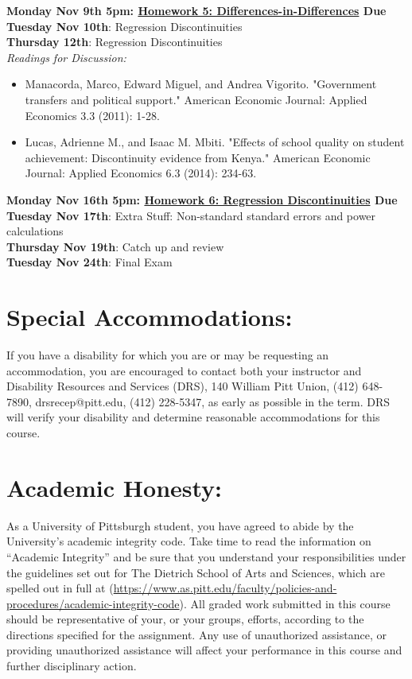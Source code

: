\documentclass[a4paper, 10pt]{article}
\begin{document}
\noindent\textbf{Monday Nov 9th 5pm: \underline{Homework 5: Differences-in-Differences} Due}\\

\noindent\textbf{Tuesday Nov 10th}: Regression Discontinuities\\

\noindent\textbf{Thursday 12th}: Regression Discontinuities\\
\noindent\textit{Readings for Discussion:}
\begin{itemize}
\item Manacorda, Marco, Edward Miguel, and Andrea Vigorito. "Government transfers and political support." American Economic Journal: Applied Economics 3.3 (2011): 1-28.
\item Lucas, Adrienne M., and Isaac M. Mbiti. "Effects of school quality on student achievement: Discontinuity evidence from Kenya." American Economic Journal: Applied Economics 6.3 (2014): 234-63.
\end{itemize}
\noindent\textbf{Monday Nov 16th 5pm: \underline{Homework 6: Regression Discontinuities} Due}\\

\noindent\noindent\textbf{Tuesday Nov 17th}: Extra Stuff: Non-standard standard errors and power calculations\\

\noindent\textbf{Thursday Nov 19th}: Catch up and review\\



\noindent\textbf{Tuesday Nov 24th}: Final Exam\\

\section*{Special Accommodations:}
If you have a disability for which you are or may be requesting an accommodation, you are encouraged to contact both your instructor and Disability Resources and Services (DRS), 140 William Pitt Union, (412) 648-7890, drsrecep@pitt.edu, (412) 228-5347, as early as possible in the term. DRS will verify your disability and determine reasonable accommodations for this course.


\section*{Academic Honesty:}
As a University of Pittsburgh student, you have agreed to abide by the University's academic integrity code. Take time to read the information on “Academic Integrity” and be sure that you understand your responsibilities under the guidelines set out for The Dietrich School of Arts and Sciences, which are spelled out in full at (\href{https://www.as.pitt.edu/faculty/policies-and-procedures/academic-integrity-code}{https://www.as.pitt.edu/faculty/policies-and-procedures/academic-integrity-code}). All graded work submitted in this course should be representative of your, or your groups, efforts, according to the directions specified for the assignment. Any use of unauthorized assistance, or providing unauthorized assistance will affect your performance in this course and further disciplinary action.
\end{document}

